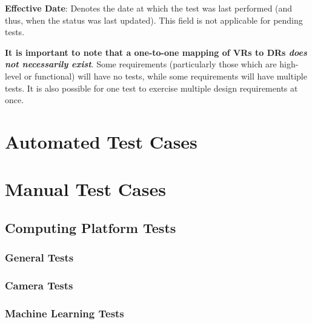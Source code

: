 \documentclass[10pt,letterpaper]{article}
\begin{document}
\textbf{Effective Date}: Denotes the date at which the test was last performed (and thus, when the status was last updated). This field is not applicable for pending tests.

\textbf{It is important to note that a one-to-one mapping of VRs to DRs \textit{does not necessarily exist}}. Some requirements (particularly those which are high-level or functional) will have no tests, while some requirements will have multiple tests. It is also possible for one test to exercise multiple design requirements at once.

\newpage
\section{Automated Test Cases} \label{begintest}



%

\newpage
\section{Manual Test Cases}

\subsection{Computing Platform Tests}
\subsubsection{General Tests}


\subsubsection{Camera Tests}


\subsubsection{Machine Learning Tests}

\end{document}
